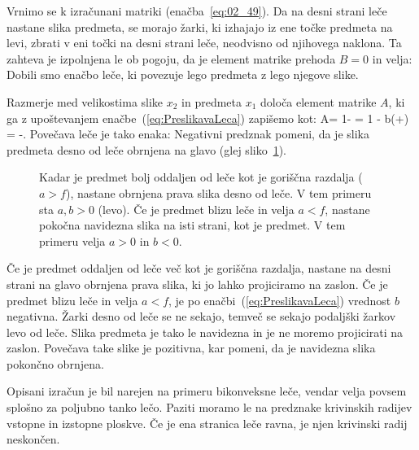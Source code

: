 Vrnimo se k izračunani matriki (enačba~\ref{eq:02_49}).
Da na desni strani leče nastane slika predmeta, se morajo 
žarki, ki izhajajo iz ene točke predmeta na levi, zbrati
v eni točki na desni strani leče, neodvisno od njihovega naklona.
Ta zahteva je izpolnjena le ob pogoju, da je element matrike prehoda $B = 0$ in velja:
Dobili smo enačbo leče, ki povezuje lego predmeta z lego njegove slike.

Razmerje med velikostima slike $x_2$ in predmeta $x_1$ določa
element matrike $A$, ki ga z upoštevanjem enačbe~(\ref{eq:PreslikavaLeca})
zapišemo kot:
\beq
A= 1- = 1 - b\left(+\right) = -.
\label{eq:02_50}
\eeq
Povečava leče je tako enaka:
Negativni predznak pomeni, da je slika predmeta desno od leče obrnjena na glavo
(glej sliko~\ref{fig:02_slikazaleco}).
\begin{figure}[!ht]
\centering
\def\svgwidth{140truemm} 

\caption{Kadar je predmet bolj oddaljen od leče kot je goriščna razdalja ($a>f$),
nastane obrnjena prava slika desno od leče. 
V tem primeru sta $a,b>0$ (levo). Če je predmet blizu leče in velja $a<f$,
nastane pokočna navidezna slika na isti strani, kot je predmet. V tem primeru velja $a>0$ in $b<0$.}
\label{fig:02_slikazaleco}
\end{figure}

Če je predmet oddaljen od leče več kot je goriščna razdalja, nastane na desni
strani na glavo obrnjena prava slika, ki jo lahko projiciramo na zaslon. Če je 
predmet blizu leče in velja $a<f$, je po enačbi~(\ref{eq:PreslikavaLeca}) 
vrednost $b$ negativna. Žarki desno od leče se ne sekajo, temveč se sekajo podaljški 
žarkov levo od leče. Slika predmeta je tako le navidezna in je
ne moremo projicirati na zaslon. Povečava take slike je pozitivna, 
kar pomeni, da je navidezna slika pokončno obrnjena.

Opisani izračun je bil narejen na primeru bikonveksne leče, vendar velja
povsem splošno za poljubno tanko lečo. Paziti moramo le na predznake krivinskih
radijev vstopne in izstopne ploskve. Če je ena stranica leče ravna, je 
njen krivinski radij neskončen. 

